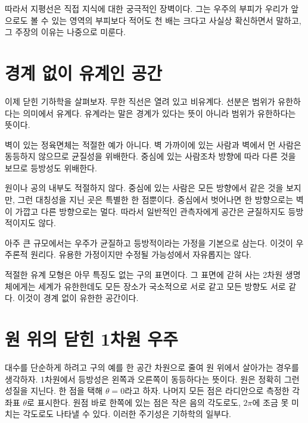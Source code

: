 따라서 지평선은 직접 지식에 대한 궁극적인 장벽이다. 그는 우주의 부피가 우리가 앞으로도 볼 수 있는 영역의 부피보다 적어도 천 배는 크다고 사실상 확신하면서 말하고, 그 주장의 이유는 나중으로 미룬다.

\section{경계 없이 유계인 공간}

이제 닫힌 기하학을 살펴보자. 무한 직선은 열려 있고 비유계다. 선분은 범위가 유한하다는 의미에서 유계다. 유계라는 말은 경계가 있다는 뜻이 아니라 범위가 유한하다는 뜻이다.

벽이 있는 정육면체는 적절한 예가 아니다. 벽 가까이에 있는 사람과 벽에서 먼 사람은 동등하지 않으므로 균질성을 위배한다. 중심에 있는 사람조차 방향에 따라 다른 것을 보므로 등방성도 위배한다.

원이나 공의 내부도 적절하지 않다. 중심에 있는 사람은 모든 방향에서 같은 것을 보지만, 그런 대칭성을 지닌 곳은 특별한 한 점뿐이다. 중심에서 벗어나면 한 방향으로는 벽이 가깝고 다른 방향으로는 멀다. 따라서 일반적인 관측자에게 공간은 균질하지도 등방적이지도 않다.

아주 큰 규모에서는 우주가 균질하고 등방적이라는 가정을 기본으로 삼는다. 이것이 우주론적 원리다. 유용한 가정이지만 수정될 가능성에서 자유롭지는 않다.

\begin{classroomqa}\end{classroomqa}

적절한 유계 모형은 아무 특징도 없는 구의 표면이다. 그 표면에 갇혀 사는 2차원 생명체에게는 세계가 유한한데도 모든 장소가 국소적으로 서로 같고 모든 방향도 서로 같다. 이것이 경계 없이 유한한 공간이다.

\section{원 위의 닫힌 1차원 우주}

대수를 단순하게 하려고 구의 예를 한 공간 차원으로 줄여 원 위에서 살아가는 경우를 생각하자. 1차원에서 등방성은 왼쪽과 오른쪽이 동등하다는 뜻이다. 원은 정확히 그런 성질을 지닌다. 한 점을 택해 \(\theta=0\)라고 하자. 나머지 모든 점은 라디안으로 측정한 각좌표 \(\theta\)로 표시한다. 원점 바로 한쪽에 있는 점은 작은 음의 각도로도, \(2\pi\)에 조금 못 미치는 각도로도 나타낼 수 있다. 이러한 주기성은 기하학의 일부다.

